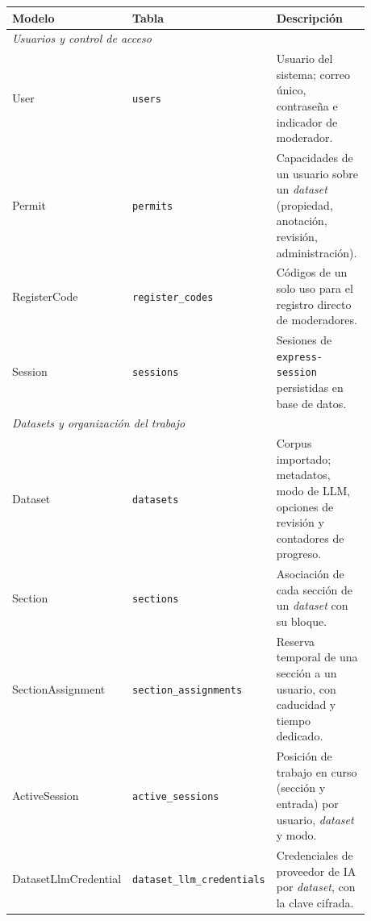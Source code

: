 \begin{longtable}{|p{0.22\linewidth}|p{0.24\linewidth}|p{0.42\linewidth}|}
	\hline
	\textbf{Modelo}         & \textbf{Tabla}                        & \textbf{Descripción}                                                                                  \\
	\hline
	\endhead
	\multicolumn{3}{|l|}{\textit{Usuarios y control de acceso}}                                                                                                             \\ \hline
	User                    & \texttt{users}                        & Usuario del sistema; correo único, contraseña e indicador de moderador.                               \\ \hline
	Permit                  & \texttt{permits}                      & Capacidades de un usuario sobre un \textit{dataset} (propiedad, anotación, revisión, administración). \\ \hline
	RegisterCode            & \texttt{register\_codes}              & Códigos de un solo uso para el registro directo de moderadores.                                       \\ \hline
	Session                 & \texttt{sessions}                     & Sesiones de \texttt{express-session} persistidas en base de datos.                                    \\ \hline
	\multicolumn{3}{|l|}{\textit{Datasets y organización del trabajo}}                                                                                                      \\ \hline
	Dataset                 & \texttt{datasets}                     & Corpus importado; metadatos, modo de LLM, opciones de revisión y contadores de progreso.              \\ \hline
	Section                 & \texttt{sections}                     & Asociación de cada sección de un \textit{dataset} con su bloque.                                      \\ \hline
	SectionAssignment       & \texttt{section\_assignments}         & Reserva temporal de una sección a un usuario, con caducidad y tiempo dedicado.                        \\ \hline
	ActiveSession           & \texttt{active\_sessions}             & Posición de trabajo en curso (sección y entrada) por usuario, \textit{dataset} y modo.                \\ \hline
	DatasetLlmCredential    & \texttt{dataset\_llm\_credentials}    & Credenciales de proveedor de IA por \textit{dataset}, con la clave cifrada.                           \\ \hline

\end{longtable}
